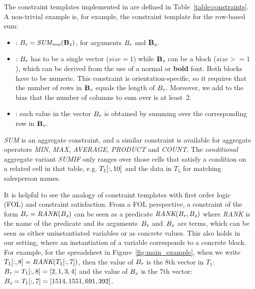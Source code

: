 \begin{example}
The constraint templates implemented in \sname are defined in Table~\ref{table:constraints}.
A non-trivial example is, for example, the constraint template for the row-based sum:

\begin{itemize}
  \item \CName: $B_{\textit{r}} = \textit{SUM\textsubscript{row}}(\mathbf{B_{\textit{x}}})$, for arguments $B_{\textit{r}}$ and $\mathbf{B_{\textit{x}}}$.
  
  \item \CSignature: $B_{\textit{r}}$ has to be a single vector ($\textit{size}=1$) while $\mathbf{B_{\textit{x}}}$ can be a block ($\textit{size}>=1$), which can be derived from the use of a normal or \textbf{bold} font.
  Both blocks have to be numeric.
  This constraint is orientation-specific, so it requires that the number of rows in $\mathbf{B_{\textit{x}}}$ equals the length of $B_{\textit{r}}$.
  Moreover, we add to the bias that the number of columns to sum over is at least~$2$.
  
  \item \CFunction: each value in the vector $B_{\textit{r}}$ is obtained by summing over the corresponding row in $\mathbf{B_{\textit{x}}}$.
\end{itemize}
\textit{SUM} is an aggregate constraint, and a similar constraint is available for aggregate operators \textit{MIN}, \textit{MAX}, \textit{AVERAGE}, \textit{PRODUCT} and \textit{COUNT}. The \textit{conditional} aggregate variant \textit{SUMIF} only ranges over those cells that satisfy a condition on a related cell in that table, e.g. $T_1[:,10]$ and the data in $T_5$ for matching salesperson names.
\end{example}


It is helpful to see the analogy of constraint templates with first order logic (FOL) and constraint satisfaction.
From a FOL perspective, a constraint of the form $B_{\textit{r}} = \textit{RANK}(B_{\textit{x}})$ can be seen as a predicate $\textit{RANK}(B_{\textit{r}}, B_{\textit{x}})$ where \textit{RANK} is the name of the predicate and its arguments~$B_{\textit{r}}$ and~$B_{\textit{x}}$ are terms, which can be seen as either uninstantiated variables or as concrete values.
This also holds in our setting, where an instantiation of a variable corresponds to a concrete block.
For example, for the spreadsheet in Figure~\ref{fig:main_example}, when we write $T_1[:,8] = \textit{RANK}(T_1[:,7])$, then the value of $B_{\textit{r}}$ is the $8$th vector in $T_1$: $B_{\textit{r}} = T_1[:,8] = [2,1,3,4]$ and the value of $B_{\textit{x}}$ is the $7$th vector: $B_{\textit{x}} = T_1[:,7] = [1514, 1551, 691, 392]$.

